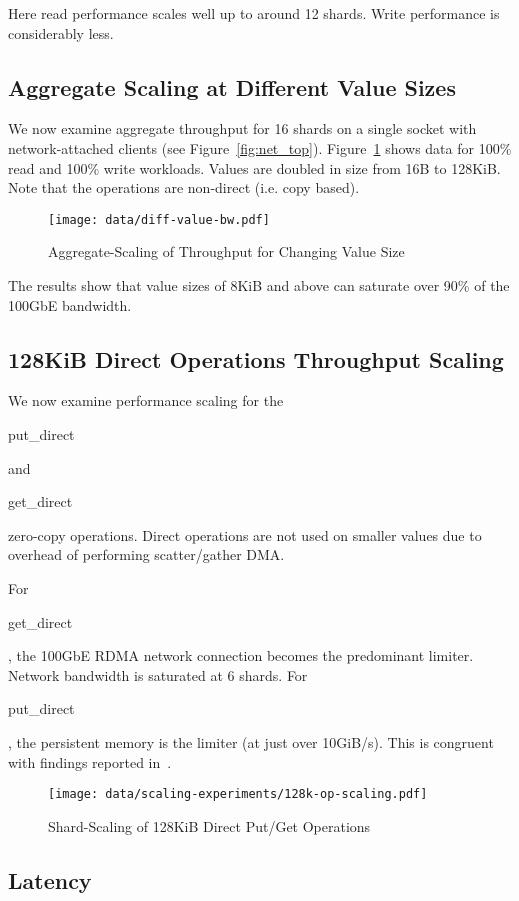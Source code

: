 \documentclass[letterpaper,twocolumn,10pt]{article}
\newcommand{\code}[1]{\begin{ttcodefont}#1\end{ttcodefont}}
\begin{document}
Here read performance scales well up to around 12 shards.  Write performance
is considerably less. 

\subsection{Aggregate Scaling at Different Value Sizes}

We now examine aggregate throughput for 16 shards on a single socket
with network-attached clients (see Figure~\ref{fig:net_top}).
Figure~\ref{plot:diffvalue-bw} shows data for 100\% read and 100\%
write workloads.  Values are doubled in size from 16B to 128KiB. Note that
the operations are non-direct (i.e. copy based).

\begin{figure}[ht!]
\centering
\texttt{[image: data/diff-value-bw.pdf]}
\caption{Aggregate-Scaling of Throughput for Changing Value Size}
\label{plot:diffvalue-bw}
\end{figure}

The results show that value sizes of 8KiB and above can saturate
over 90\% of the 100GbE bandwidth.


\subsection{128KiB Direct Operations Throughput Scaling}

We now examine performance scaling for the \code{put\_direct} and
\code{get\_direct} zero-copy operations.  Direct operations are not
used on smaller values due to overhead of performing scatter/gather
DMA.

For \code{get\_direct}, the 100GbE RDMA network connection becomes the
predominant limiter.  Network bandwidth is saturated at 6 shards.  For
\code{put\_direct}, the persistent memory is the limiter (at just over
10GiB/s).  This is congruent with findings reported
in~\cite{izraelevitz2019basic}.

\begin{figure}[ht!]
\centering
\texttt{[image: data/scaling-experiments/128k-op-scaling.pdf]}
\caption{Shard-Scaling of 128KiB Direct Put/Get Operations}
\label{plot:128kop}
\end{figure}

\goodbreak
\subsection{Latency}
\end{document}
